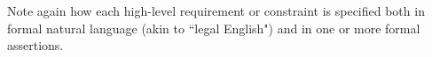 \documentclass[letterpaper,twocolumn,10pt]{article}
\begin{document}
 Note again how each high-level requirement or constraint is specified
 both in formal natural language (akin to ``legal English") and in one or more
 formal assertions.
 
% 
% 
% 
\end{document}
